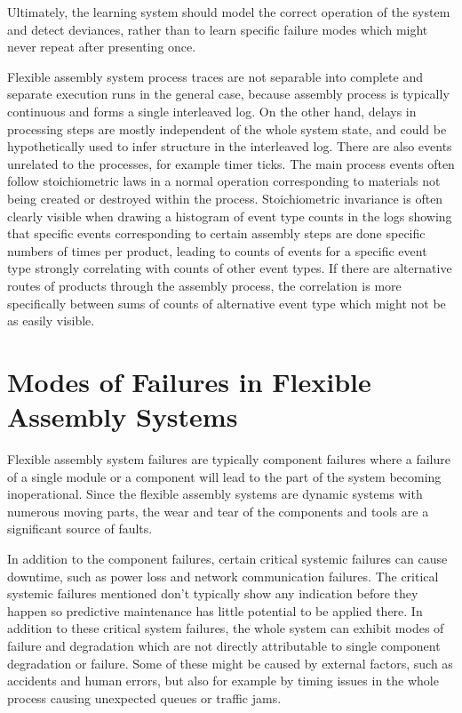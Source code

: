\documentclass[procedia]{easychair}
\begin{document}
Ultimately, the learning system should model the correct operation of the system and detect deviances, rather than to learn specific failure modes which might never repeat after presenting once.

Flexible assembly system process traces are not separable into complete and separate execution runs in the general case, because assembly process is typically continuous and
forms a single interleaved log.
On the other hand, delays in processing steps are mostly independent of the whole system state, and could be hypothetically used to infer structure in the interleaved log.
There are also events unrelated to the processes, for example timer ticks. The main process events often follow stoichiometric laws in a normal operation corresponding to materials
not being created or destroyed within the process. Stoichiometric invariance is often clearly visible when drawing a histogram of event type counts in the logs showing that specific events corresponding to certain
assembly steps are done specific numbers of times per product, leading to counts of events for a specific event type strongly correlating with counts of other event types. If there are alternative routes of products
through the assembly process, the correlation is more specifically between sums of counts of alternative event type which might not be as easily visible.

\section{Modes of Failures in Flexible Assembly Systems}

Flexible assembly system failures are typically component failures where a failure of a single module or a component will lead to the part of the system becoming inoperational.
Since the flexible assembly systems are dynamic systems with numerous moving parts, the wear and tear of the components and tools are a significant source of faults.

In addition to the component failures, certain critical systemic failures can cause downtime, such as power loss and network communication failures.
The critical systemic failures mentioned don't typically show any indication before they happen so predictive maintenance has little potential to be applied there.
In addition to these critical system failures,
the whole system can exhibit modes of failure and degradation which are not directly attributable to single component degradation or failure.
Some of these might be caused by
external factors, such as accidents and human errors, but also for example by timing issues in the whole process causing unexpected queues or traffic jams.
\end{document}
